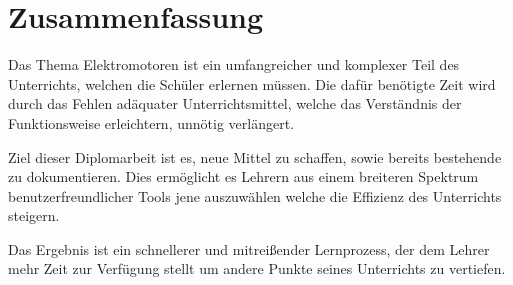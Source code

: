 \section*{Zusammenfassung}

Das Thema Elektromotoren ist ein umfangreicher und komplexer Teil des Unterrichts, welchen die Schüler erlernen müssen. Die dafür benötigte Zeit wird durch das Fehlen adäquater Unterrichtsmittel, welche das Verständnis der Funktionsweise erleichtern, unnötig verlängert.

Ziel dieser Diplomarbeit ist es, neue Mittel zu schaffen, sowie bereits bestehende zu dokumentieren. Dies ermöglicht es Lehrern aus einem breiteren Spektrum benutzerfreundlicher Tools jene auszuwählen welche die Effizienz des Unterrichts steigern.

Das Ergebnis ist ein schnellerer und mitreißender Lernprozess, der dem Lehrer mehr Zeit zur Verfügung stellt um andere Punkte seines Unterrichts zu vertiefen.

\newpage